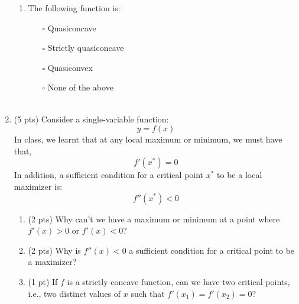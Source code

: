 \documentclass{./../../Latex/tests}
\begin{document}
\begin{enumerate}
\begin{enumerate}

\item The following function is:
\begin{center}
\end{center}
\begin{itemize}
  \item[$\square$] Quasiconcave
  \item[$\square$] Strictly quasiconcave
  \item[$\square$] Quasiconvex
  \item[$\square$] None of the above \\~\\
\end{itemize} 
\end{enumerate} 

\newpage

\item (5 pts) Consider a single-variable function:
 $$ y = f(x) $$
 In class, we learnt that at any local maximum or minimum, we must have that, 
 $$ f'(x^*) = 0 $$
 In addition, a sufficient condition for a critical point $x^*$ to be a local maximizer is:
 $$ f''(x^*) <0 $$ 
 \begin{enumerate}
  \item (2 pts) Why can't we have a maximum or minimum at a point where $f'(x)>0$ or $f'(x)<0$?
  \vspace{6cm} 
  \item (2 pts) Why is $f''(x) <0$ a sufficient condition for a critical point to be a maximizer?
  \vspace{6cm} 
  \item (1 pt) If $f$ is a strictly concave function, can we have two critical points, i.e., two distinct values of $x$ such that $f'(x_1) = f'(x_2) = 0$?
\end{enumerate}


\end{enumerate}
\end{document}
